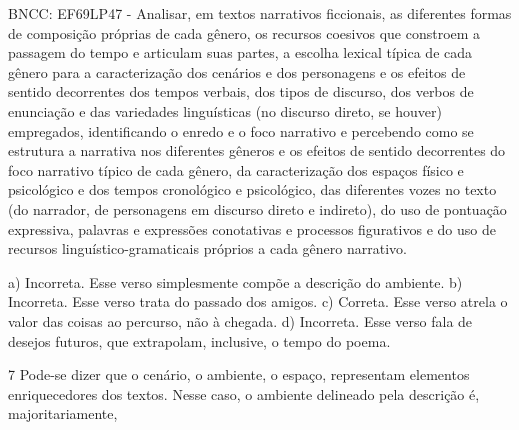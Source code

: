 \begin{escolha}
\begin{escolha}
\begin{escolha}
\begin{escolha}
\begin{escolha}
\begin{escolha}
\begin{escolha}
BNCC: EF69LP47 - Analisar, em textos narrativos ficcionais, as
diferentes formas de composição próprias de cada gênero, os recursos
coesivos que constroem a passagem do tempo e articulam suas partes, a
escolha lexical típica de cada gênero para a caracterização dos cenários
e dos personagens e os efeitos de sentido decorrentes dos tempos
verbais, dos tipos de discurso, dos verbos de enunciação e das
variedades linguísticas (no discurso direto, se houver) empregados,
identificando o enredo e o foco narrativo e percebendo como se estrutura
a narrativa nos diferentes gêneros e os efeitos de sentido decorrentes
do foco narrativo típico de cada gênero, da caracterização dos espaços
físico e psicológico e dos tempos cronológico e psicológico, das
diferentes vozes no texto (do narrador, de personagens em discurso
direto e indireto), do uso de pontuação expressiva, palavras e
expressões conotativas e processos figurativos e do uso de recursos
linguístico-gramaticais próprios a cada gênero narrativo.

a) Incorreta. Esse verso simplesmente compõe a descrição do ambiente. b)
Incorreta. Esse verso trata do passado dos amigos. c) Correta. Esse
verso atrela o valor das coisas ao percurso, não à chegada. d)
Incorreta. Esse verso fala de desejos futuros, que extrapolam,
inclusive, o tempo do poema.

\num{7} Pode-se dizer que o cenário, o ambiente, o espaço, representam
elementos enriquecedores dos textos. Nesse caso, o ambiente delineado
pela descrição é, majoritariamente,

\end{escolha}
\end{escolha}
\end{escolha}
\end{escolha}
\end{escolha}
\end{escolha}
\end{escolha}
